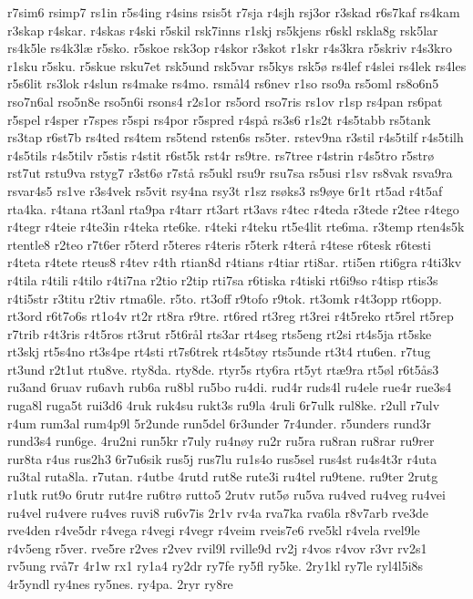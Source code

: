 {r7sim6
rsimp7
rs1in
r5s4ing
r4sins
rsis5t
r7sja
r4sjh
rsj3or
r3skad
r6s7kaf
rs4kam
r3skap
r4skar.
r4skas
r4ski
r5skil
rsk7inns
r1skj
rs5kjens
r6skl
rskla8g
rsk5lar
rs4k5le
rs4k3læ
r5sko.
r5skoe
rsk3op
r4skor
r3skot
r1skr
r4s3kra
r5skriv
r4s3kro
r1sku
r5sku.
r5skue
rsku7et
rsk5und
rsk5var
rs5kys
rsk5ø
rs4lef
r4slei
rs4lek
rs4les
r5s6lit
rs3lok
r4slun
rs4make
rs4mo.
rsmål4
rs6nev
r1so
rso9a
rs5oml
rs8o6n5
rso7n6al
rso5n8e
rso5n6i
rsons4
r2s1or
rs5ord
rso7ris
rs1ov
r1sp
rs4pan
rs6pat
r5spel
r4sper
r7spes
r5spi
rs4por
r5spred
r4spå
rs3s6
r1s2t
r4s5tabb
rs5tank
rs3tap
r6st7b
rs4ted
rs4tem
rs5tend
rsten6s
rs5ter.
rstev9na
r3stil
r4s5tilf
r4s5tilh
r4s5tils
r4s5tilv
r5stis
r4stit
r6st5k
rst4r
rs9tre.
rs7tree
r4strin
r4s5tro
r5strø
rst7ut
rstu9va
rstyg7
r3st6ø
r7stå
rs5ukl
rsu9r
rsu7sa
rs5usi
r1sv
rs8vak
rsva9ra
rsvar4s5
rs1ve
r3s4vek
rs5vit
rsy4na
rsy3t
r1sz
rsøks3
rs9øye
6r1t
rt5ad
r4t5af
rta4ka.
r4tana
rt3anl
rta9pa
r4tarr
rt3art
rt3avs
r4tec
r4teda
r3tede
r2tee
r4tego
r4tegr
r4teie
r4te3in
r4teka
rte6ke.
r4teki
r4teku
rt5e4lit
rte6ma.
r3temp
rten4s5k
rtentle8
r2teo
r7t6er
r5terd
r5teres
r4teris
r5terk
r4terå
r4tese
r6tesk
r6testi
r4teta
r4tete
rteus8
r4tev
r4th
rtian8d
r4tians
r4tiar
rti8ar.
rti5en
rti6gra
r4ti3kv
r4tila
r4tili
r4tilo
r4ti7na
r2tio
r2tip
rti7sa
r6tiska
r4tiski
rt6i9so
r4tisp
rtis3s
r4ti5str
r3titu
r2tiv
rtma6le.
r5to.
rt3off
r9tofo
r9tok.
rt3omk
r4t3opp
rt6opp.
rt3ord
r6t7o6s
rt1o4v
rt2r
rt8ra
r9tre.
rt6red
rt3reg
rt3rei
r4t5reko
rt5rel
rt5rep
r7trib
r4t3ris
r4t5ros
rt3rut
r5t6rål
rts3ar
rt4seg
rts5eng
rt2si
rt4s5ja
rt5ske
rt3skj
rt5s4no
rt3s4pe
rt4sti
rt7s6trek
rt4s5tøy
rts5unde
rt3t4
rtu6en.
r7tug
rt3und
r2t1ut
rtu8ve.
rty8da.
rty8de.
rtyr5s
rty6ra
rt5yt
rtæ9ra
rt5øl
r6t5ås3
ru3and
6ruav
ru6avh
rub6a
ru8bl
ru5bo
ru4di.
rud4r
ruds4l
ru4ele
rue4r
rue3s4
ruga8l
ruga5t
rui3d6
4ruk
ruk4su
rukt3s
ru9la
4ruli
6r7ulk
rul8ke.
r2ull
r7ulv
r4um
rum3al
rum4p9l
5r2unde
run5del
6r3under
7r4under.
r5unders
rund3r
rund3s4
run6ge.
4ru2ni
run5kr
r7uly
ru4nøy
ru2r
ru5ra
ru8ran
ru8rar
ru9rer
rur8ta
r4us
rus2h3
6r7u6sik
rus5j
rus7lu
ru1s4o
rus5sel
rus4st
ru4s4t3r
r4uta
ru3tal
ruta8la.
r7utan.
r4utbe
4rutd
rut8e
rute3i
ru4tel
ru9tene.
ru9ter
2rutg
r1utk
rut9o
6rutr
rut4re
ru6trø
rutto5
2rutv
rut5ø
ru5va
ru4ved
ru4veg
ru4vei
ru4vel
ru4vere
ru4ves
ruvi8
ru6v7is
2r1v
rv4a
rva7ka
rva6la
r8v7arb
rve3de
rve4den
r4ve5dr
r4vega
r4vegi
r4vegr
r4veim
rveis7e6
rve5kl
r4vela
rvel9le
r4v5eng
r5ver.
rve5re
r2ves
r2vev
rvil9l
rville9d
rv2j
r4vos
r4vov
r3vr
rv2s1
rv5ung
rvå7r
4r1w
rx1
ry1a4
ry2dr
ry7fe
ry5fl
ry5ke.
2ry1kl
ry7le
ryl4l5i8s
4r5yndl
ry4nes
ry5nes.
ry4pa.
2ryr
ry8re
}
